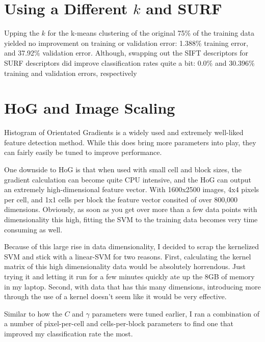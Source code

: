 \documentclass[12pt]{article}
\begin{document}
\section*{Using a Different $k$ and SURF}

Upping the $k$ for the k-means clustering of the original 75\% of the
training data yielded no improvement on training or validation error:
1.388\% training error, and 37.92\% validation error. Although, swapping
out the SIFT descriptors for SURF descriptors did improve classification
rates quite a bit: 0.0\% and 30.396\% training and validation errors,
respectively

\section*{HoG and Image Scaling}

Histogram of Orientated Gradients is a widely used and extremely well-liked
feature detection method. While this does bring more parameters into play, they
can fairly easily be tuned to improve performance.

One downside to HoG is that when used with small cell and block sizes, the
gradient calculation can become quite CPU intensive, and the HoG can output
an extremely high-dimensional feature vector. With 1600x2500 images, 4x4 pixels
per cell, and 1x1 cells per block the feature vector consited of over 800,000
dimensions. Obviously, as soon as you get over more than a few data points with
dimensionality this high, fitting the SVM to the training data becomes very time
consuming as well.

Because of this large rise in data dimensionality, I decided to scrap the kernelized
SVM and stick with a linear-SVM for two reasons. First, calculating the kernel matrix
of this high dimensionality data would be absolutely horrendous. Just trying it and
letting it run for a few minutes quickly ate up the 8GB of memory in my laptop. Second,
with data that has this many dimensions, introducing more through the use of a kernel
doesn't seem like it would be very effective.

Similar to how the $C$ and $\gamma$ parameters were tuned earlier, I ran a combination
of a number of pixel-per-cell and cells-per-block parameters to find one that
improved my classification rate the most.
\end{document}
